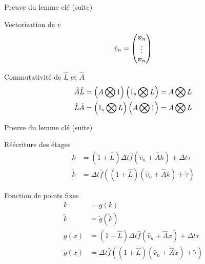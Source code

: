 \begin{frame}[<+->]{Preuve du lemme clé (suite)}
 \begin{block}{Vectorisation de $v$}
  \begin{equation*}
\hat{v}_{n}=\begin{pmatrix}
	      {\boldsymbol {v}}_{n}\\
	      \vdots\\
	      {\boldsymbol {v}}_{n}
	      \end{pmatrix}
\end{equation*}
 \end{block}
 
 \begin{block}{Commutativité de $\hat{L}$ et $\hat{A}$}
  \begin{align*}
\hat{A}\hat{L}&=\left(A\bigotimes 1 \right)
  \left(1_{s}\bigotimes L\right)=
	A\bigotimes L\\
    \hat{L}\hat{A}&=
  \left(1_{s}\bigotimes L\right)
	\left(A \bigotimes 1 \right)=
	A\bigotimes L
\end{align*}
 \end{block}

\end{frame}

\begin{frame}[<+->]{Preuve du lemme clé (suite)}
 \begin{block}{Réécriture des étages}
  \begin{align*}
k&=(1+\hat{L})\Delta t\hat{f}(\hat{v}_{n}+\hat{A}k)+\Delta t\tau\\
\tilde{k}&=\Delta t \hat{f}((1+\hat{L})(\hat{v}_{n}+\hat{A}k)+\tilde{\tau})
\end{align*}
 \end{block}
 
 \begin{block}{Fonction de points fixes}
  \begin{align*}
k&=g(k)\\
\tilde{k}&=\tilde{g}(\tilde{k})\\
g(x)&=(1+\hat{L})\Delta t \hat{f}(\hat{v}_{n}+\hat{A}x)+\Delta t\tau\\
\tilde{g}(x)&=\Delta t \hat{f}((1+\hat{L})(\hat{v}_{n}+\hat{A}x)+\tilde{\tau})
\end{align*}
 \end{block}

\end{frame}

